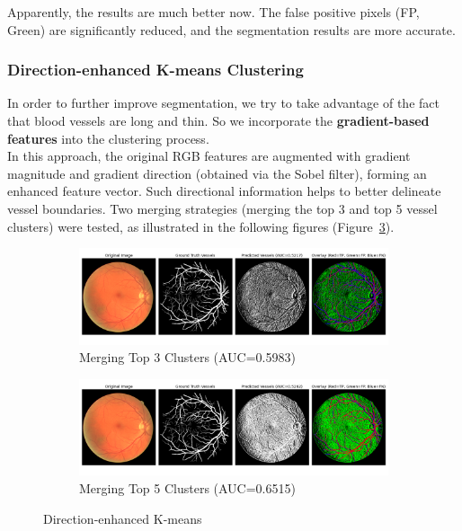 \documentclass[12pt,letterpaper]{article}
\begin{document}
\noindent
Apparently, the results are much better now. The false positive pixels (FP, Green) are significantly reduced, and the segmentation results are more accurate. 
\subsubsection{Direction-enhanced K-means Clustering}
In order to further improve segmentation, we try to take advantage of the fact that blood vessels are long and thin. So we incorporate the \textbf{gradient-based features} into the clustering process. \\
In this approach, the original RGB features are augmented with gradient magnitude and gradient direction (obtained via the Sobel filter), forming an enhanced feature vector. Such directional information helps to better delineate vessel boundaries. Two merging strategies (merging the top 3 and top 5 vessel clusters) were tested, as illustrated in the following figures (Figure~\ref{fig:de}).
\begin{figure}[H]
    \centering
    \begin{subfigure}[H]{\textwidth}
        \centering
        \includegraphics[scale=0.35]{Figures/5 Directed (Merge 3 Clusters).png}
        \vspace{-0.5cm}
        \caption{Merging Top 3 Clusters (AUC=0.5983)}
        \label{fig:de3}
    \end{subfigure}
    \begin{subfigure}[H]{\textwidth}
        \centering
        \includegraphics[scale=0.35]{Figures/5 Directed (Merge 5 Clusters).png}
        \vspace{-0.5cm}
        \caption{Merging Top 5 Clusters (AUC=0.6515)}
        \label{fig:de5}
    \end{subfigure}
    \caption{Direction-enhanced K-means}
    \label{fig:de}
\end{figure}
\end{document}
